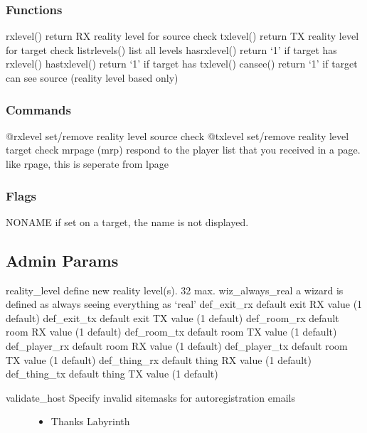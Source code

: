 \documentclass[letterpaper,10pt,english]{sphinxmanual}
\begin{document}
\subsubsection{Functions}
\label{\detokenize{changelog:id35}}
\sphinxAtStartPar
rxlevel() \sphinxhyphen{} return RX reality level for source check
txlevel() \sphinxhyphen{} return TX reality level for target check
listrlevels() \sphinxhyphen{} list all levels
hasrxlevel() \sphinxhyphen{} return ‘1’ if target has rxlevel()
hastxlevel() \sphinxhyphen{} return ‘1’ if target has txlevel()
cansee() \sphinxhyphen{} return ‘1’ if target can see source (reality level based only)


\subsubsection{Commands}
\label{\detokenize{changelog:id36}}
\sphinxAtStartPar
@rxlevel \sphinxhyphen{} set/remove reality level source check
@txlevel \sphinxhyphen{} set/remove reality level target check
mrpage (mrp) \sphinxhyphen{} respond to the player list that you received in a page.  like rpage, this is seperate from lpage


\subsubsection{Flags}
\label{\detokenize{changelog:id37}}
\sphinxAtStartPar
NONAME \sphinxhyphen{} if set on a target, the name is not displayed.


\subsection{Admin Params}
\label{\detokenize{changelog:id38}}
\sphinxAtStartPar
reality\_level     \sphinxhyphen{} define new reality level(s).  32 max.
wiz\_always\_real   \sphinxhyphen{} a wizard is defined as always seeing everything as ‘real’
def\_exit\_rx       \sphinxhyphen{} default exit RX value (1 default)
def\_exit\_tx       \sphinxhyphen{} default exit TX value (1 default)
def\_room\_rx       \sphinxhyphen{} default room RX value (1 default)
def\_room\_tx       \sphinxhyphen{} default room TX value (1 default)
def\_player\_rx     \sphinxhyphen{} default room RX value (1 default)
def\_player\_tx     \sphinxhyphen{} default room TX value (1 default)
def\_thing\_rx      \sphinxhyphen{} default thing RX value (1 default)
def\_thing\_tx      \sphinxhyphen{} default thing TX value (1 default)
\begin{description}
\item[{validate\_host     \sphinxhyphen{} Specify invalid site\sphinxhyphen{}masks for autoregistration emails}] \leavevmode\begin{itemize}
\item {} 
\sphinxAtStartPar
Thanks  Labyrinth

\end{itemize}

\end{description}
\end{document}
